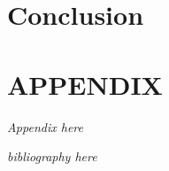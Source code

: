 \documentclass{article}
\begin{document}
\section{Conclusion}


\section{APPENDIX}
\textit{Appendix here}

\begin{thebibliography}{99}
\textit{bibliography here}
\end{thebibliography}
\end{document}
